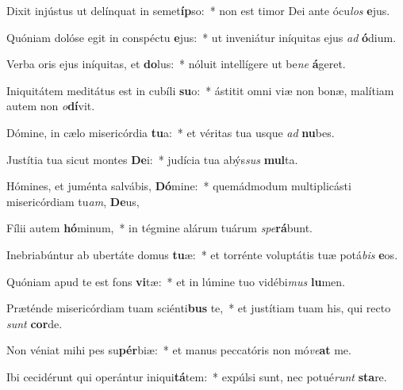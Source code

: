 \item Dixit injústus ut delínquat in semet\textbf{íp}so:~* non est timor Dei ante ócu\textit{los} \textbf{e}jus.
\item Quóniam dolóse egit in conspéctu \textbf{e}jus:~* ut inveniátur iníquitas ejus \textit{ad} \textbf{ó}dium.
\item Verba oris ejus iníquitas, et \textbf{do}lus:~* nóluit intellígere ut be\textit{ne} \textbf{á}geret.
\item Iniquitátem meditátus est in cubíli \textbf{su}o:~* ástitit omni viæ non bonæ, malítiam autem non \textit{o}\textbf{dí}vit.
\item Dómine, in cælo misericórdia \textbf{tu}a:~* et véritas tua usque \textit{ad} \textbf{nu}bes.
\item Justítia tua sicut montes \textbf{De}i:~* judícia tua abýs\textit{sus} \textbf{mul}ta.
\item Hómines, et juménta salvábis, \textbf{Dó}mine:~* quemádmodum multiplicásti misericórdiam tu\textit{am}, \textbf{De}us,
\item Fílii autem \textbf{hó}minum,~* in tégmine alárum tuárum \textit{spe}\textbf{rá}bunt.
\item Inebriabúntur ab ubertáte domus \textbf{tu}æ:~* et torrénte voluptátis tuæ potá\textit{bis} \textbf{e}os.
\item Quóniam apud te est fons \textbf{vi}tæ:~* et in lúmine tuo vidébi\textit{mus} \textbf{lu}men.
\item Præténde misericórdiam tuam sciénti\textbf{bus} te,~* et justítiam tuam his, qui recto \textit{sunt} \textbf{cor}de.
\item Non véniat mihi pes su\textbf{pér}biæ:~* et manus peccatóris non mó\textit{ve}\textbf{at} me.
\item Ibi cecidérunt qui operántur iniqui\textbf{tá}tem:~* expúlsi sunt, nec potué\textit{runt} \textbf{sta}re.
